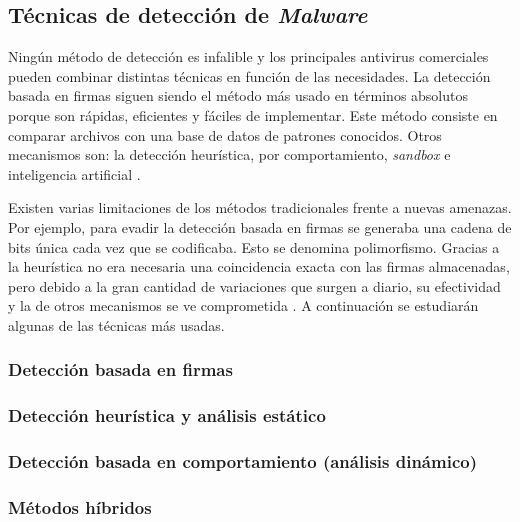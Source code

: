 \subsection{Técnicas de detección de \textit{Malware}}
\label{subsec:deteccion_malware}

Ningún método de detección es infalible y los principales antivirus comerciales pueden combinar distintas técnicas en función de las necesidades. La detección basada en firmas siguen siendo el método más usado en términos absolutos porque son rápidas, eficientes y fáciles de implementar. Este método consiste en comparar archivos con una base de datos de patrones conocidos. Otros mecanismos son: la detección heurística, por comportamiento, \textit{sandbox} e inteligencia artificial \cite{antivirus}.

\vspace{1em}

Existen varias limitaciones de los métodos tradicionales frente a nuevas amenazas. Por ejemplo, para evadir la detección basada en firmas se generaba una cadena de bits única cada vez que se codificaba. Esto se denomina polimorfismo. Gracias a la heurística no era necesaria una coincidencia exacta con las firmas almacenadas, pero debido a la gran cantidad de variaciones que surgen a diario, su efectividad y la de otros mecanismos se ve comprometida \cite{limitaciones}. A continuación se estudiarán algunas de las técnicas más usadas.

\subsubsection{Detección basada en firmas}
\label{subsubsec:firmas}

\subsubsection{Detección heurística y análisis estático}
\label{subsubsec:heuristica}

\subsubsection{Detección basada en comportamiento (análisis dinámico)}
\label{subsubsec:comportamiento}

\subsubsection{Métodos híbridos}
\label{subsubsec:hibridos}

